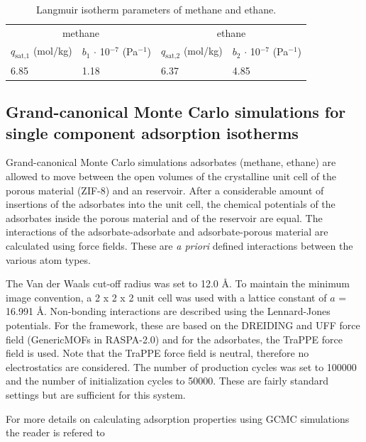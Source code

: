 \documentclass{article}
\begin{document}
\begin{table}[h!]
\centering
\caption{Langmuir isotherm parameters of methane and ethane.}
\label{tab:isotherm_parameters}
\begin{tabular}{l l l l}
\toprule
\multicolumn{2}{c}{methane} & \multicolumn{2}{c}{ethane}\\
$q_\text{sat,1}$ (mol/kg) & $b_1$ $\cdot$ 10$^{-7}$ (Pa$^{-1}$) & $q_\text{sat,2}$ (mol/kg) & $b_2$  $\cdot$ 10$^{-7}$ (Pa$^{-1}$) \\
\midrule
6.85 & 1.18 & 6.37 & 4.85 \\
\bottomrule
\end{tabular}
\end{table}

\clearpage

\subsection{Grand-canonical Monte Carlo simulations for single component adsorption isotherms}
\label{sec:gcmc_simulations} 
Grand-canonical Monte Carlo simulations adsorbates (methane, ethane) are allowed to move between the open volumes of the crystalline unit cell of the porous material (ZIF-8) and an reservoir. After a considerable amount of insertions of the adsorbates into the unit cell, the chemical potentials of the adsorbates inside the porous material and of the reservoir are equal. The interactions of the adsorbate-adsorbate and adsorbate-porous material are calculated using force fields. These are \textit{a priori} defined interactions between the various atom types.

The Van der Waals cut-off radius was set to 12.0 {\AA}. To maintain the minimum image convention, a 2 x 2 x 2 unit cell was used with a lattice constant of $a$ = 16.991 \AA. Non-bonding interactions are described using the Lennard-Jones potentials. For the framework, these are based on the DREIDING and UFF force field (GenericMOFs in RASPA-2.0) and for the adsorbates, the TraPPE force field is used. Note that the TraPPE force field is neutral, therefore no electrostatics are considered. The number of production cycles was set to 100000 and the number of initialization cycles to 50000. These are fairly standard settings but are sufficient for this system.  

For more details on calculating adsorption properties using GCMC simulations the reader is refered to \cite{Frenkel2001,Dubbeldam2013,Dubbeldam2015}









\end{document}

